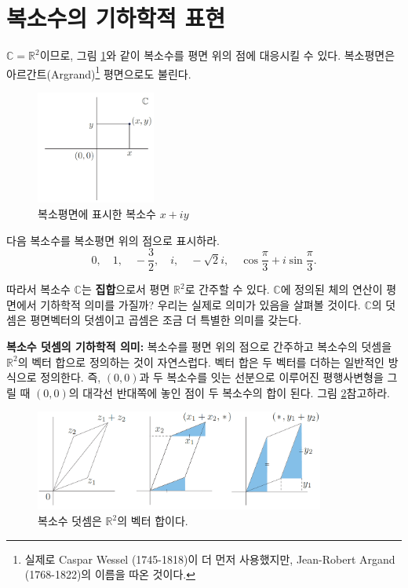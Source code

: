 \section{복소수의 기하학적 표현}

$\mathbb C = \mathbb R^2$이므로, 
그림 \ref{fig-1-2}와 같이 복소수를 평면 위의 점에 대응시킬 수 있다.
복소평면은  아르간트(Argrand)\footnote{ 
실제로 Caspar Wessel (1745-1818)이 더 먼저 사용했지만,
Jean-Robert Argand (1768-1822)의 이름을 따온 것이다.} 
평면으로도 불린다.

\begin{figure}[!h]
\begin{center}
\includegraphics[width=0.35\textwidth]{./SaltChapter/figs/fig-1-2}
\end{center}
\caption{복소평면에 표시한 복소수 $x+iy$}
\label{fig-1-2}
\end{figure}


\begin{salt_exercise} \label{ex-1-4}
다음 복소수를 복소평면 위의 점으로 표시하라.
$$
0, \quad 1 , \quad -\frac32, \quad i, \quad -\sqrt{2}i,
\quad \cos \frac\pi3 + i\sin\frac\pi3.
$$
\end{salt_exercise}

따라서 복소수 $\mathbb C$는 {\bf 집합}으로서 평면 $\mathbb R^2$로 간주할 수 있다.
$\mathbb C$에 정의된 체의 연산이 평면에서 기하학적 의미를 가질까?
우리는 실제로 의미가 있음을 살펴볼 것이다.
$\mathbb C$의 덧셈은 평면벡터의 덧셈이고
곱셈은 조금 더 특별한 의미를 갖는다.

{\bf 복소수 덧셈의 기하학적 의미: }
복소수를 평면 위의 점으로 간주하고 복소수의 덧셈을 $\mathbb R^2$의 벡터 합으로 
정의하는 것이 자연스럽다. 
벡터 합은 두 벡터를 더하는 일반적인 방식으로 정의한다.
즉, $(0,0)$과 두 복소수를 잇는 선분으로 이루어진 평행사변형을 그릴 때
$(0,0)$의 대각선 반대쪽에 놓인 점이 두 복소수의 합이 된다.
그림 \ref{fig-1-3}\을 참고하라.

\begin{figure}[!h]
\begin{center}
\includegraphics[width=0.85\textwidth]{./SaltChapter/figs/fig-1-3}
\end{center}
\caption{복소수 덧셈은 $\mathbb R^2$의 벡터 합이다.}
\label{fig-1-3}
\end{figure}

